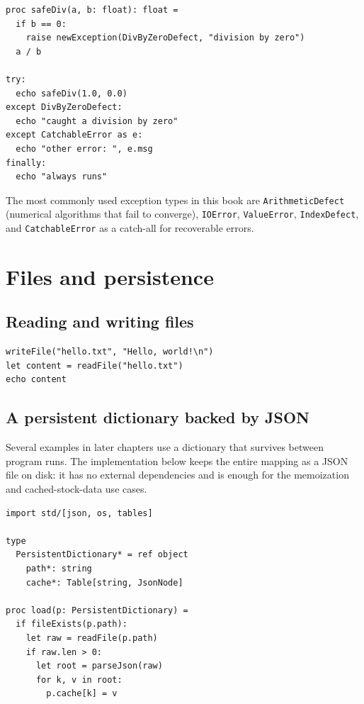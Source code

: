 \documentclass[justified, sixbynine]{tufte-book}
\def\ft{\small\tt}
\theoremstyle{plain}%
\newtheorem * {corollary}{Corollary}
\theoremstyle{definition}
\theoremstyle{remark}
\newtheorem * {remark}{Remark}
\newtheorem * {note}{Note}
\begin{document}
\begin{fullwidth}
\begin{lstlisting}
proc safeDiv(a, b: float): float =
  if b == 0:
    raise newException(DivByZeroDefect, "division by zero")
  a / b

try:
  echo safeDiv(1.0, 0.0)
except DivByZeroDefect:
  echo "caught a division by zero"
except CatchableError as e:
  echo "other error: ", e.msg
finally:
  echo "always runs"
\end{lstlisting}

The most commonly used exception types in this book are {\ft ArithmeticDefect} (numerical algorithms that fail to converge), {\ft IOError}, {\ft ValueError}, {\ft IndexDefect}, and {\ft CatchableError} as a catch-all for recoverable errors.

\goodbreak\section{Files and persistence}

\goodbreak\subsection{Reading and writing files}

\begin{lstlisting}
writeFile("hello.txt", "Hello, world!\n")
let content = readFile("hello.txt")
echo content
\end{lstlisting}

\goodbreak\subsection{A persistent dictionary backed by JSON}

Several examples in later chapters use a dictionary that survives between program runs. The implementation below keeps the entire mapping as a JSON file on disk: it has no external dependencies and is enough for the memoization and cached-stock-data use cases.


\begin{lstlisting}[caption={in file: {\ft nlib/persistent.nim}}]
import std/[json, os, tables]

type
  PersistentDictionary* = ref object
    path*: string
    cache*: Table[string, JsonNode]

proc load(p: PersistentDictionary) =
  if fileExists(p.path):
    let raw = readFile(p.path)
    if raw.len > 0:
      let root = parseJson(raw)
      for k, v in root:
        p.cache[k] = v


\end{lstlisting}
\end{fullwidth}
\end{document}
